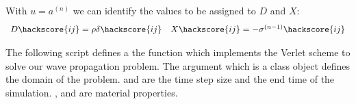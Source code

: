 With $u=a^{(n)}$ we can identify the values to be assigned to $D$ and $X$:
\begin{equation}\label{WAVE  dyn 6}
\begin{array}{ll}
D\hackscore{ij}=\rho \delta\hackscore{ij}&
X\hackscore{ij}=-\sigma^{(n-1)}\hackscore{ij} \\
\end{array}
\end{equation}


 
The following script defines a the function  which
implements the Verlet scheme to solve our wave propagation problem. 
The argument  which is a \Domain class object
defines the domain of the problem.  and  are the time step size
and the end time of the simulation. ,  and 
 are material properties. 
